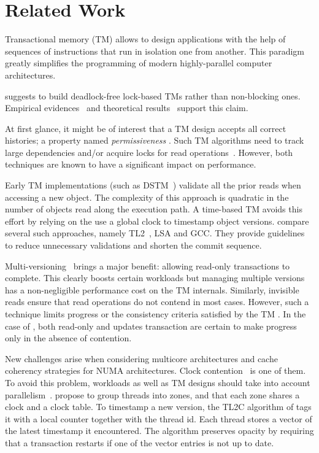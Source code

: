 \section{Related Work}

Transactional memory (TM) allows to design applications with the help of sequences of instructions that run in isolation one from another.
This paradigm greatly simplifies the programming of modern highly-parallel computer architectures.

\citet{emals} suggests to build deadlock-free lock-based TMs rather than non-blocking ones.
Empirical evidences~\cite{dice06} and theoretical results~\cite{Guerraoui:2008,KuznetsovR15} support this claim.

At first glance, it might be of interest that a TM design accepts all correct histories; a property named \emph{permissiveness} \cite{guerraoui08}.
Such TM algorithms need to track large dependencies \cite{Keidar:2009} and/or acquire locks for read operations~\cite{Attiya2012}.
However, both techniques are known to have a significant impact on performance.

Early TM implementations (such as DSTM~\cite{herlihy2003software}) validate all the prior reads when accessing a new object.
The complexity of this approach is quadratic in the number of objects read along the execution path.
A time-based TM avoids this effort by relying on the use a global clock to timestamp object versions.
\citet{zhang2008commit} compare several such approaches, namely TL2~\cite{dice2006transactional}, LSA \cite{riegel2006lazy} and GCC\cite{spear2006conflict}.
They provide guidelines to reduce unnecessary validations and shorten the commit sequence.

Multi-versioning~\cite{Fernandes:2011, Diegues:2014} brings a major benefit: allowing read-only transactions to complete.
This clearly boosts certain workloads but managing multiple versions has a non-negligible performance cost on the TM internals.
Similarly, invisible reads ensure that read operations do not contend in most cases.
However, such a technique limits progress or the consistency criteria satisfied by the TM \cite{Attiya:2009}.
In the case of , both read-only and updates transaction are certain to make progress only in the absence of contention.

New challenges arise when considering multicore architectures and cache coherency strategies for NUMA architectures.
Clock contention~\cite{6121290} is one of them.
To avoid this problem, workloads as well as TM designs should take into account parallelism~\cite{Nguyen:2017}.
\citet{6121290} propose to group threads into zones, and that each zone shares a clock and a clock table.
To timestamp a new version, the TL2C algorithm of \citet{Avni:2008} tags it with a local counter together with the thread id.
Each thread stores a vector of the latest timestamp it encountered.
The algorithm preserves opacity by requiring that a transaction restarts if one of the vector entries is not up to date.

